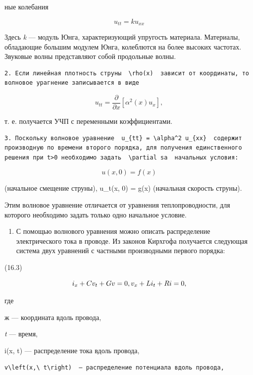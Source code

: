 \documentclass[
  ukrainian,
]{article}
\providecommand{\tightlist}{%
  \setlength{\itemsep}{0pt}\setlength{\parskip}{0pt}}
\begin{document}
ные колебания

\[
u_{tt} = ku_{xx}
\]

Здесь \emph{k} --- модуль Юнга, характеризующий упругость материала.
Материалы, обладающие большим модулем Юнга, колеблются на более высоких
частотах. Звуковые волны представляют собой продольные волны.

\begin{verbatim}
2. Если линейная плотность струны  \rho(x)  зависит от координаты, то волновое урагнение записывается в виде
\end{verbatim}

\[
u_{tt} = \frac{\partial}{\partial x} [\alpha^2(x) u_x],
\]

т. е. получается УЧП с переменными коэффициентами.

\begin{verbatim}
3. Поскольку волновое уравнение  u_{tt} = \alpha^2 u_{xx}  содержит производную по времени второго порядка, для получения единственного решения при t>0 необходимо задать  \partial sa  начальных условия:
\end{verbatim}

\[
u(x, 0) = f(x)
\]

(начальное смещение струны), u\_t(x, 0) = g(x) (начальная скорость
струны).

Этим волновое уравнение отличается от уравнения теплопроводности, для
которого необходимо задать только одно начальное условие.

\begin{enumerate}
\def\labelenumi{\arabic{enumi}.}
\setcounter{enumi}{3}
\tightlist
\item
  С помощью волнового уравнения можно описать распределение
  электрического тока в проводе. Из законов Кирхгофа получается
  следующая система двух уравнений с частными производными первого
  порядка:
\end{enumerate}

(16.3)

\[
i_x + Cv_t + Gv = 0, \\ v_x + Li_t + Ri = 0,
\]

где

ж --- координата вдоль провода,

\emph{t} --- время,

i(x, t) --- распределение тока вдоль провода,

\begin{verbatim}
v\left(x,\ t\right)  — распределение потенциала вдоль провода,
\end{verbatim}
\end{document}

